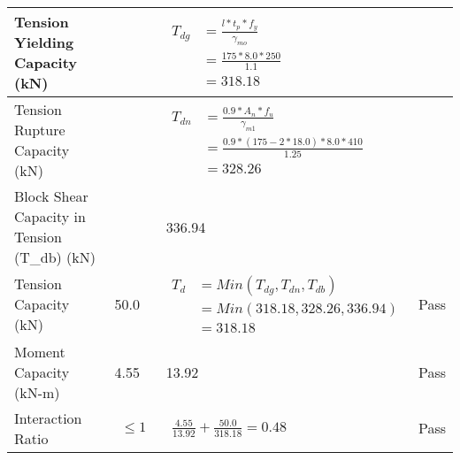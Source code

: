 \documentclass{article}%
\begin{document}
\begin{longtable}{|p{4cm}|p{5cm}|p{5.5cm}|p{1.5cm}|}
\hline%
Tension Yielding Capacity (kN)&&$\begin{aligned} T_{dg} &= \frac{l*t_p*f_y}{\gamma_{mo}}\\ &=\frac{175*8.0*250}{1.1}\\ &=318.18\end{aligned}$&\\%
\hline%
Tension Rupture Capacity (kN)&&$\begin{aligned} T_{dn} &= \frac{0.9*A_{n}*f_u}{\gamma_{m1}}\\ &=\frac{0.9*(175-2*18.0)*8.0*410}{1.25}\\ &=328.26\end{aligned}$&\\%
\hline%
Block Shear Capacity in Tension (T\_db) (kN)&&336.94&\\%
\hline%
Tension Capacity (kN)&50.0&$\begin{aligned} T_d &= Min(T_{dg},T_{dn},T_{db})\\ &= Min(318.18,328.26,336.94)\\ &=318.18\end{aligned}$&Pass\\%
\hline%
Moment Capacity (kN{-}m)&4.55&13.92&Pass\\%
\hline%
Interaction Ratio&$\begin{aligned} \leq1\end{aligned}$&$\begin{aligned} \frac{4.55}{13.92}+\frac{50.0}{318.18}=0.48\end{aligned}$&Pass\\%
\hline%
\end{longtable}

%
\newpage%
\end{document}
